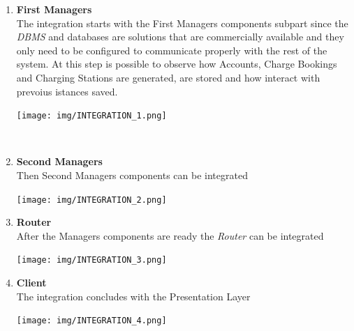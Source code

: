 \documentclass[a4paper]{report}
\begin{document}
\begin{enumerate}
    \item \textbf{First Managers}\\
    The integration starts with the First Managers components subpart since the \textit{DBMS} and databases are solutions that are commercially available and they only need to be configured to communicate properly with the rest of the system. At this step is possible to observe how Accounts, Charge Bookings and Charging Stations are generated, are stored and how interact with prevoius istances saved.\newline$ $\newline$ $\newline$ $\newline\par
    \begin{minipage}{\linewidth}
        \centering
        \texttt{[image: img/INTEGRATION\_1.png]}
    \end{minipage}

    $ $\newline
    $ $\newline
    $ $\newline
    $ $\newline
    $ $\newline

    \item \textbf{Second Managers}\\
    Then Second Managers components can be integrated\newline$ $\newline$ $\newline\par
    \begin{minipage}{\linewidth}
        \centering
        \texttt{[image: img/INTEGRATION\_2.png]}
    \end{minipage}\newline\newline

    \item \textbf{Router}\\
    After the Managers components are ready the \textit{Router} can be integrated\newline$ $\newline$ $\newline\par
    \begin{minipage}{\linewidth}
        \centering
        \texttt{[image: img/INTEGRATION\_3.png]}
    \end{minipage}

    \item \textbf{Client}\\
    The integration concludes with the Presentation Layer\par
    \begin{minipage}{\linewidth}
        \centering
        \texttt{[image: img/INTEGRATION\_4.png]}
    \end{minipage}
\end{enumerate}
\end{document}
